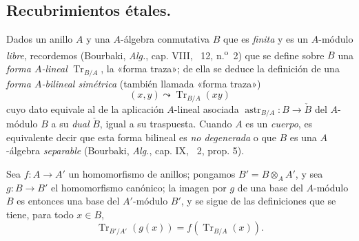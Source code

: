 \subsection{Recubrimientos étales.}
\label{subsection:IV.18.2}


\begin{env}[18.2.1]
\label{IV.18.2.1}
Dados un anillo $A$ y una $A$-álgebra conmutativa $B$ que es \emph{finita} y es un $A$-módulo \emph{libre}, recordemos (Bourbaki, \emph{Alg.}, cap. VIII, \textsection~12, n.\textsuperscript{o}~2) que se define sobre $B$ una \emph{forma $A$-lineal} $\operatorname{Tr}_{B/A}$, la «forma traza»; de ella se deduce la definición de una \emph{forma $A$-bilineal simétrica} (también llamada «forma traza»)
\begin{equation}
  (x,y)\leadsto\operatorname{Tr}_{B/A}(xy)
  \tag{18.2.1.1}\label{IV.18.2.1.1}
\end{equation}
cuyo dato equivale al de la aplicación $A$-lineal asociada $\operatorname{astr}_{B/A}:B\to\check B$ del $A$-módulo $B$ a su \emph{dual} $\check B$, igual a su traspuesta. Cuando $A$ es un \emph{cuerpo}, es equivalente decir que esta forma bilineal es \emph{no degenerada} o que $B$ es una $A$-álgebra \emph{separable} (Bourbaki, \emph{Alg.}, cap. IX, \textsection~2, prop. 5).

Sea $f:A\to A'$ un homomorfismo de anillos; pongamos $B'=B\otimes_A A'$, y sea $g:B\to B'$ el homomorfismo canónico; la imagen por $g$ de una base del $A$-módulo $B$ es entonces una base del $A'$-módulo $B'$, y se sigue de las definiciones que se tiene, para todo $x\in B$,
\begin{equation}
  \operatorname{Tr}_{B'/A'}(g(x))=f(\operatorname{Tr}_{B/A}(x)).
  \tag{18.2.1.2}\label{IV.18.2.1.2}
\end{equation}
\end{env}

